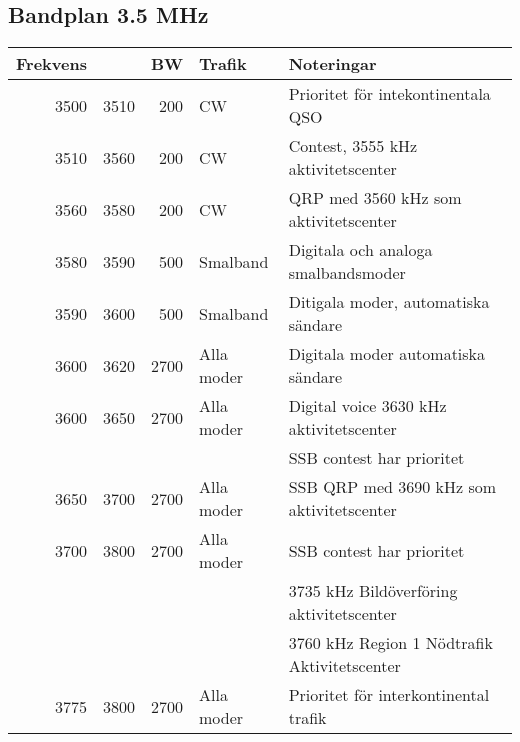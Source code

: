 \begin{landscape}
\subsection{Bandplan 3.5 MHz}
\begin{tabular}{rrrll}
\textbf{Frekvens} &      & \textbf{BW} & \textbf{Trafik} & \textbf{Noteringar}                          \\ \hline
3500              & 3510 & 200         & CW              & Prioritet för intekontinentala QSO \\ \hline
3510              & 3560 & 200         & CW              & Contest, 3555 kHz aktivitetscenter           \\ \hline
3560              & 3580 & 200         & CW              & QRP med 3560 kHz som aktivitetscenter        \\ \hline
3580              & 3590 & 500         & Smalband        & Digitala och analoga smalbandsmoder          \\ \hline
3590              & 3600 & 500         & Smalband        & Ditigala moder, automatiska sändare          \\ \hline
3600              & 3620 & 2700        & Alla moder      & Digitala moder automatiska sändare           \\ \hline
3600              & 3650 & 2700        & Alla moder      & Digital voice 3630 kHz aktivitetscenter      \\ 
                  &      &             &                 & SSB contest har prioritet                    \\ \hline
3650              & 3700 & 2700        & Alla moder      & SSB QRP med 3690 kHz som aktivitetscenter    \\ \hline
3700              & 3800 & 2700        & Alla moder      & SSB contest har prioritet                    \\
                  &      &             &                 & 3735 kHz Bildöverföring aktivitetscenter     \\
                  &      &             &                 & 3760 kHz Region 1 Nödtrafik Aktivitetscenter \\ \hline
3775              & 3800 & 2700        & Alla moder      & Prioritet för interkontinental trafik        \\ \hline
\end{tabular}
\clearpage


\end{landscape}
